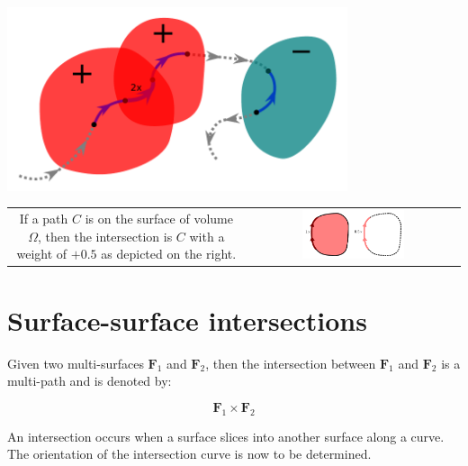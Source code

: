 \documentclass{book}
\begin{document}
\begin{center}
\includegraphics[width = 0.75\textwidth]{Intersections/Path-volume_intersections/path_volume_intersections_example_3}
\end{center}


\begin{tabular}{cc}
\parbox{0.5\textwidth}{
If a path \(C\) is on the surface of volume \(\Omega\), then the intersection is \(C\) with a weight of \(+0.5\) as depicted on the right.
} & \parbox{0.5\textwidth}{
\includegraphics[width = 0.5\textwidth]{Intersections/Path-volume_intersections/path_volume_intersection_boundary_case}
}
\end{tabular}






\section{Surface-surface intersections}

Given two multi-surfaces \(\mathbf{F}_1\) and \(\mathbf{F}_2\), then the intersection between \(\mathbf{F}_1\) and \(\mathbf{F}_2\) is a multi-path and is denoted by:

\[\mathbf{F}_1 \times \mathbf{F}_2\]

An intersection occurs when a surface slices into another surface along a curve. The orientation of the intersection curve is now to be determined. 
\end{document}
